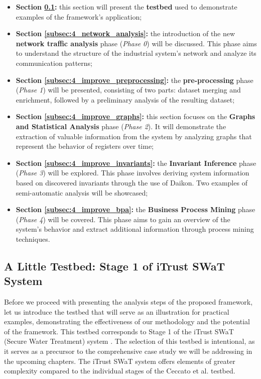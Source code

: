 \begin{itemize}
	\item \textbf{Section \ref{subsec:4_casestudy_plc1}:} this section will present the \textbf{testbed} used to demonstrate examples of the framework's application;

	\item \textbf{Section \ref{subsec:4_network_analysis}:} the introduction of the new \textbf{network traffic analysis} phase (\textit{Phase 0}) will be discussed. This phase aims to understand the structure of the industrial system's network and analyze its communication patterns;

	\item \textbf{Section \ref{subsec:4_improve_preprocessing}:} the \textbf{pre-processing} phase (\textit{Phase 1}) will be presented, consisting of two parts: dataset merging and enrichment, followed by a preliminary analysis of the resulting dataset;

	\item \textbf{Section \ref{subsec:4_improve_graphs}:} this section focuses on the \textbf{Graphs and Statistical Analysis} phase (\textit{Phase 2}). It will demonstrate the extraction of valuable information from the system by analyzing graphs that represent the behavior of registers over time;

	\item \textbf{Section \ref{subsec:4_improve_invariants}:} the \textbf{Invariant Inference} phase (\textit{Phase 3}) will be explored. This phase involves deriving system information based on discovered invariants through the use of Daikon. Two examples of semi-automatic analysis will be showcased;

	\item \textbf{Section \ref{subsec:4_improve_bpa}:} the \textbf{Business Process Mining} phase (\textit{Phase 4}) will be covered. This phase aims to gain an overview of the system's behavior and extract additional information through process mining techniques.
\end{itemize}

\subsection{A Little Testbed: Stage 1 of iTrust SWaT System}
\label{subsec:4_casestudy_plc1}
Before we proceed with presenting the analysis steps of the proposed framework, let us introduce the testbed that will serve as an illustration for practical examples, demonstrating the effectiveness of our methodology and the potential of the framework. This testbed corresponds to Stage 1 of the iTrust SWaT (Secure Water Treatment) system \cite{swat_home}. The selection of this testbed is intentional, as it serves as a precursor to the comprehensive case study we will be addressing in the upcoming chapters. The iTrust SWaT system offers elements of greater complexity compared to the individual stages of the Ceccato et al. testbed.

